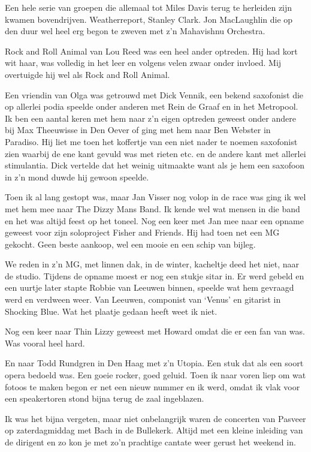 \documentclass[10pt,twoside,openright]{memoir}
\begin{document}
Een hele serie van groepen die allemaal tot Miles Davis terug te herleiden zijn kwamen bovendrijven. Weatherreport, Stanley Clark. Jon MacLaughlin die op den duur wel heel erg begon te zweven met z’n Mahavishnu Orchestra.

Rock and Roll Animal van Lou Reed was een heel ander optreden. Hij had kort wit haar, was volledig in het leer en volgens velen zwaar onder invloed. Mij overtuigde hij wel als Rock and Roll Animal.

Een vriendin van Olga was getrouwd met Dick Vennik, een bekend saxofonist die op allerlei podia speelde onder anderen met Rein de Graaf en in het Metropool. Ik ben een aantal keren met hem naar z’n eigen optreden geweest onder andere bij Max Theeuwisse in Den Oever of ging met hem naar Ben Webster in Paradiso. Hij liet me toen het koffertje van een niet nader te noemen saxofonist zien waarbij de ene kant gevuld was met rieten etc. en de andere kant met allerlei stimulantia. Dick vertelde dat het weinig uitmaakte want als je hem een saxofoon in z’n mond duwde hij gewoon speelde.

Toen ik al lang gestopt was, maar Jan Visser nog volop in de race was ging ik wel met hem mee naar The Dizzy Mans Band. Ik kende wel wat mensen in die band en het was altijd feest op het toneel. Nog een keer met Jan mee naar een opname geweest voor zijn soloproject Fisher and Friends. Hij had toen net een MG gekocht. Geen beste aankoop, wel een mooie en een schip van bijleg. 

We reden in z’n MG, met linnen dak, in de winter, kacheltje deed het niet, naar de studio. Tijdens de opname moest er nog een stukje sitar in. Er werd gebeld en een uurtje later stapte Robbie van Leeuwen binnen, speelde wat hem gevraagd werd en verdween weer. Van Leeuwen, componist van ‘Venus’ en gitarist in Shocking Blue. Wat het plaatje gedaan heeft weet ik niet.

Nog een keer naar Thin Lizzy geweest met Howard omdat die er een fan van was. Was vooral heel hard. 

En naar Todd Rundgren in Den Haag met z’n Utopia. Een stuk dat als een soort opera bedoeld was. Een goeie rocker, goed geluid. Toen ik naar voren liep om wat fotoos te maken begon er net een nieuw nummer en ik werd, omdat ik vlak voor een speakertoren stond bijna terug de zaal ingeblazen.

Ik was het bijna vergeten, maar niet onbelangrijk waren de concerten van Pasveer op zaterdagmiddag met Bach in de Bullekerk. Altijd met een kleine inleiding van de dirigent en zo kon je met zo’n prachtige cantate weer gerust het weekend in.
\end{document}
